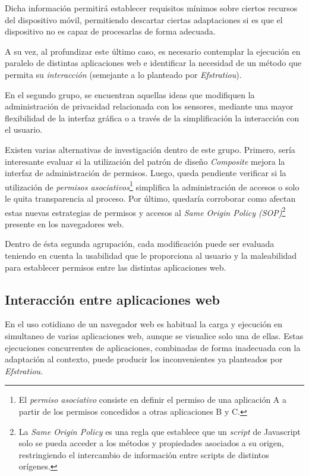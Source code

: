 Dicha información permitirá establecer requisitos mínimos sobre ciertos recursos del dispositivo móvil, permitiendo descartar ciertas adaptaciones si es que el dispositivo no es capaz de procesarlas de forma adecuada.

A su vez, al profundizar este último caso, es necesario contemplar la ejecución en paralelo de distintas aplicaciones web e identificar la necesidad de un método que permita su \emph{interacción} (semejante a lo planteado por \emph{Efstratiou}\cite[p.~5]{Efstratiou04}).

En el segundo grupo, se encuentran aquellas ideas que modifiquen la administración de privacidad relacionada con los sensores, mediante una mayor flexibilidad de la interfaz gráfica o a través de la simplificación la interacción con el usuario.

Existen varias alternativas de investigación dentro de este grupo. Primero, sería interesante evaluar si la utilización del patrón de diseño \emph{Composite}\cite[p.~151]{Gamma95} mejora la interfaz de administración de permisos. Luego, queda pendiente verificar si la utilización de \emph{permisos asociativos}\footnote{El \emph{permiso asociativo} consiste en definir el permiso de una aplicación A a partir de los permisos concedidos a otras aplicaciones B y C.} simplifica la administración de accesos o solo le quita transparencia al proceso. Por último, quedaría corroborar como afectan estas nuevas estrategias de permisos y accesos al \emph{Same Origin Policy (SOP)}\footnote{
La \emph{Same Origin Policy} es una regla que establece que un \emph{script} de Javascript solo se pueda acceder a los métodos y propiedades asociados a su origen, restringiendo el intercambio de información entre scripts de distintos orígenes.} presente en los navegadores web.

Dentro de ésta segunda agrupación, cada modificación puede ser evaluada teniendo en cuenta la usabilidad que le proporciona al usuario y la maleabilidad para establecer permisos entre las distintas aplicaciones web.


\subsection{Interacción entre aplicaciones web}

En el uso cotidiano de un navegador web es habitual la carga y ejecución en simultaneo de varias aplicaciones web, aunque se visualice solo una de ellas. Estas ejecuciones concurrentes de aplicaciones, combinadas de forma inadecuada con la adaptación al contexto, puede producir los inconvenientes ya planteados por \emph{Efstratiou}\cite[p.~5]{Efstratiou04}.

